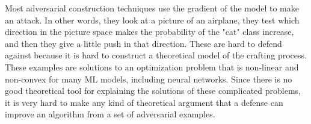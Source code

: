 Most adversarial construction techniques use the gradient of the model to make an attack. In other words, they look at a picture of an airplane, they test which direction in the picture space makes the probability of the "cat" class increase, and then they give a little push in that direction. These are hard to defend against because it is hard to construct a theoretical model of the crafting process. These examples are solutions to an optimization problem that is non-linear and non-convex for many ML models, including neural networks. Since there is no good theoretical tool for explaining the solutions of these complicated problems, it is very hard to make any kind of theoretical argument that a defense can improve an algorithm from a set of adversarial examples.